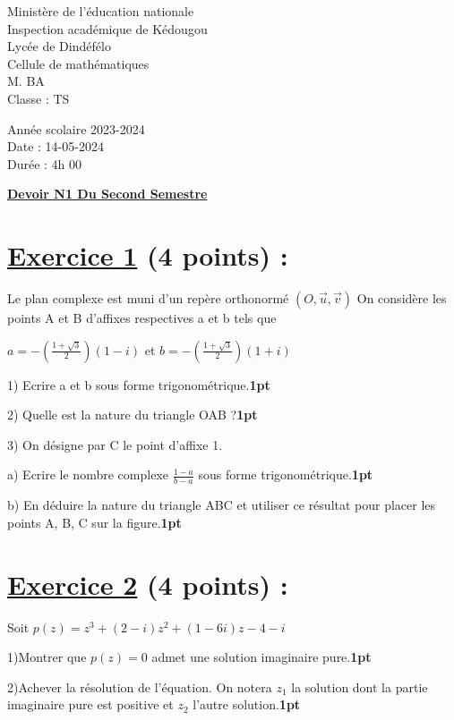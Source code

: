 \documentclass[12pt]{article}
\begin{document}
\begin{minipage}{0.5\textwidth}
	Ministère de l'éducation nationale  \\
	Inspection académique de Kédougou   \\
	Lycée de Dindéfélo            \\
	Cellule de mathématiques            \\
	M. BA                          \\
	Classe : TS  \\
\end{minipage}
\begin{minipage}{0.5\textwidth}
	Année scolaire 2023-2024 \\
	Date : 14-05-2024 \\
	Durée : 4h 00 \\
\end{minipage}

\begin{center}
	\textbf{{\underline{Devoir N1 Du Second Semestre}}}
\end{center}

\section*{\underline{Exercice 1} (4 points) :}
Le plan complexe est muni d’un repère orthonormé $(O,\vec{u},\vec{v})$
On considère les points A et B d’affixes respectives a et b tels que

$a=-(\frac{1+\sqrt{3}}{2})(1-i)$ et $b=-(\frac{1+\sqrt{3}}{2})(1+i)$ 

1) Ecrire a et b sous forme trigonométrique.\textbf{1pt}

2) Quelle est la nature du triangle OAB ?\textbf{1pt}

3) On désigne par C le point d’affixe 1.

a) Ecrire le nombre complexe $\frac{1-a}{b-a}$  sous forme trigonométrique.\textbf{1pt}

b) En déduire la nature du triangle ABC et  utiliser ce résultat pour placer les points A, B, C sur la figure.\textbf{1pt}
\section*{\underline{Exercice 2} (4 points) :}
Soit $p(z)=z^{3}+(2-i)z^{2}+(1-6i)z-4-i$

1)Montrer que $p(z)=0$ admet une solution imaginaire pure.\textbf{1pt}

2)Achever la résolution de l’équation. On notera $z_{1}$ la solution dont la partie imaginaire pure est positive et $z_{2}$ l’autre solution.\textbf{1pt}
\end{document}
